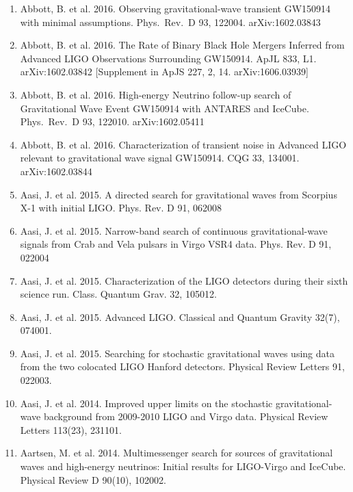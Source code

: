 \documentclass[margin,line]{res}
\begin{document}
\begin{resume}
\begin{enumerate}
\item Abbott, B. et al. 2016. Observing gravitational-wave transient GW150914 with minimal assumptions.  Phys.~Rev.~D 93, 122004. arXiv:1602.03843

\item Abbott, B. et al. 2016. The Rate of Binary Black Hole Mergers Inferred from Advanced LIGO Observations Surrounding GW150914. ApJL 833, L1.  arXiv:1602.03842  [Supplement in ApJS 227, 2, 14. arXiv:1606.03939]

\item Abbott, B. et al. 2016.  High-energy Neutrino follow-up search of Gravitational Wave Event GW150914 with ANTARES and IceCube.   Phys.~Rev.~D 93, 122010. arXiv:1602.05411

\item Abbott, B. et al. 2016. Characterization of transient noise in Advanced LIGO relevant to gravitational wave signal GW150914.   CQG 33, 134001. arXiv:1602.03844

\item Aasi, J. et al. 2015. A directed search for gravitational waves from Scorpius X-1 with initial LIGO.  Phys. Rev. D 91, 062008

\item Aasi, J. et al. 2015. Narrow-band search of continuous gravitational-wave signals from Crab and Vela pulsars in Virgo VSR4 data.  Phys. Rev. D 91, 022004

\item Aasi, J. et al. 2015. Characterization of the LIGO detectors during their sixth science run. Class. Quantum Grav. 32, 105012.

\item Aasi, J. et al. 2015. Advanced LIGO. Classical and Quantum Gravity 32(7), 074001. 

\item Aasi, J. et al. 2015. Searching for stochastic gravitational waves using data from the two colocated LIGO Hanford detectors. Physical Review Letters 91, 022003. 

\item Aasi, J. et al. 2014. Improved upper limits on the stochastic gravitational-wave background from 2009-2010 LIGO and Virgo data. Physical Review Letters 113(23),  231101. 

\item Aartsen, M. et al. 2014. Multimessenger search for sources of gravitational waves and high-energy neutrinos: Initial results for LIGO-Virgo and IceCube. Physical Review D 90(10), 102002.


\end{enumerate}
\end{resume}
\end{document}
